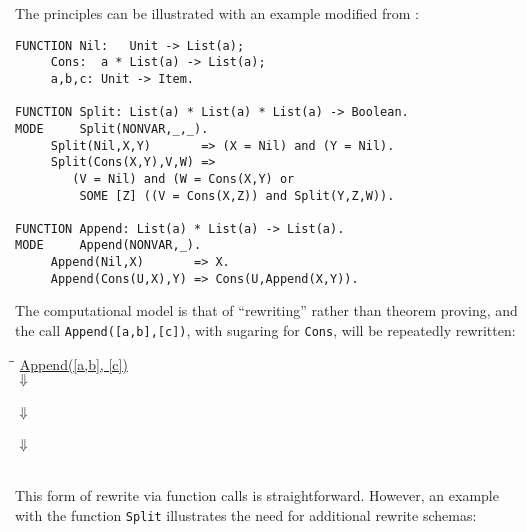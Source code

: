 \begin{minipage}[h]{\textwidth}
The principles can be illustrated with an example modified from \cite{Llo94}:
\begin{verbatim}
FUNCTION Nil:   Unit -> List(a);
	 Cons:  a * List(a) -> List(a);
	 a,b,c: Unit -> Item.

FUNCTION Split: List(a) * List(a) * List(a) -> Boolean.
MODE     Split(NONVAR,_,_).
	 Split(Nil,X,Y)       => (X = Nil) and (Y = Nil).
	 Split(Cons(X,Y),V,W) => 
	    (V = Nil) and (W = Cons(X,Y) or
	     SOME [Z] ((V = Cons(X,Z)) and Split(Y,Z,W)).

FUNCTION Append: List(a) * List(a) -> List(a).
MODE     Append(NONVAR,_).
	 Append(Nil,X)       => X.
	 Append(Cons(U,X),Y) => Cons(U,Append(X,Y)).
\end{verbatim}
\end{minipage}

The computational model is that of ``rewriting'' rather than theorem proving, and the call
\texttt{Append([a,b],[c])}, with sugaring for \texttt{Cons}, will be repeatedly rewritten:

\begin{ttfamily}
\begin{tabbing}
\hspace*{2cm}\=\hspace{2cm}\=\kill
\>\underline{Append([a,b], [c])}\\
\>\>$\Downarrow$\\
\\
\>\>$\Downarrow$\\
\\
\>\>$\Downarrow$\\
\>[a,b,c]\\
\end{tabbing}
\end{ttfamily}

This form of rewrite via function calls is straightforward.  However, an example with
the function \texttt{Split} illustrates the need for additional rewrite schemas:


